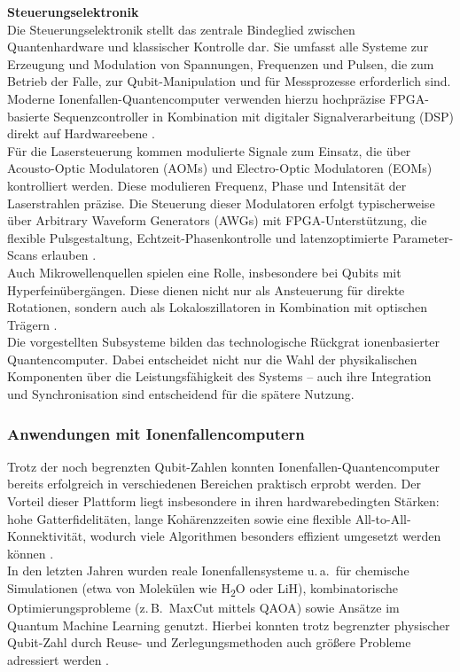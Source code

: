 \textbf{Steuerungselektronik} \\
Die Steuerungselektronik stellt das zentrale Bindeglied zwischen Quantenhardware und klassischer Kontrolle dar. Sie umfasst alle Systeme zur Erzeugung und Modulation von Spannungen, Frequenzen und Pulsen, die zum Betrieb der Falle, zur Qubit-Manipulation und für Messprozesse erforderlich sind. Moderne Ionenfallen-Quantencomputer verwenden hierzu hochpräzise FPGA-basierte Sequenzcontroller in Kombination mit digitaler Signalverarbeitung (DSP) direkt auf Hardwareebene \cite{keysight2024}. \\
Für die Lasersteuerung kommen modulierte Signale zum Einsatz, die über Acousto-Optic Modulatoren (AOMs) und Electro-Optic Modulatoren (EOMs) kontrolliert werden. Diese modulieren Frequenz, Phase und Intensität der Laserstrahlen präzise. Die Steuerung dieser Modulatoren erfolgt typischerweise über Arbitrary Waveform Generators (AWGs) mit FPGA-Unterstützung, die flexible Pulsgestaltung, Echtzeit-Phasenkontrolle und latenzoptimierte Parameter-Scans erlauben \cite{keysight2024}. \\
Auch Mikrowellenquellen spielen eine Rolle, insbesondere bei Qubits mit Hyperfeinübergängen. Diese dienen nicht nur als Ansteuerung für direkte Rotationen, sondern auch als Lokaloszillatoren in Kombination mit optischen Trägern \cite{keysight2024}. \\

Die vorgestellten Subsysteme bilden das technologische Rückgrat ionenbasierter Quantencomputer. Dabei entscheidet nicht nur die Wahl der physikalischen Komponenten über die Leistungsfähigkeit des Systems – auch ihre Integration und Synchronisation sind entscheidend für die spätere Nutzung.

\subsubsection{Anwendungen mit Ionenfallencomputern}
Trotz der noch begrenzten Qubit-Zahlen konnten Ionenfallen-Quantencomputer bereits erfolgreich in verschiedenen Bereichen praktisch erprobt werden. Der Vorteil dieser Plattform liegt insbesondere in ihren hardwarebedingten Stärken: hohe Gatterfidelitäten, lange Kohärenzzeiten sowie eine flexible All-to-All-Konnektivität, wodurch viele Algorithmen besonders effizient umgesetzt werden können \cite{strohm2024}. \\

In den letzten Jahren wurden reale Ionenfallensysteme u.\,a.\ für chemische Simulationen (etwa von Molekülen wie H\textsubscript{2}O oder LiH), kombinatorische Optimierungsprobleme (z.\,B.\ MaxCut mittels QAOA) sowie Ansätze im Quantum Machine Learning genutzt. Hierbei konnten trotz begrenzter physischer Qubit-Zahl durch Reuse- und Zerlegungsmethoden auch größere Probleme adressiert werden \cite{strohm2024}. \\

